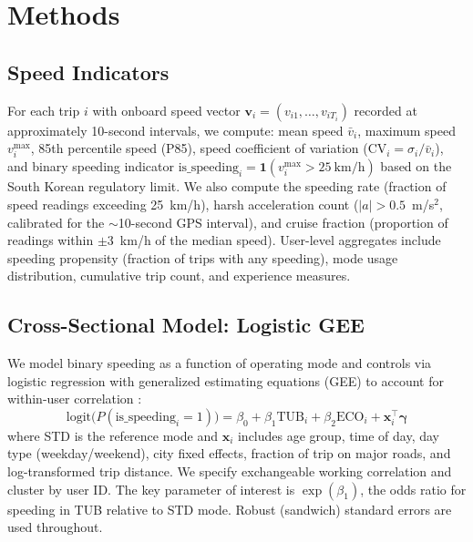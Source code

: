 \section{Methods}
\label{sec:methodology}

\subsection{Speed Indicators}
\label{sec:meth_indicators}

For each trip $i$ with onboard speed vector $\mathbf{v}_i = (v_{i1}, \ldots, v_{iT_i})$ recorded at approximately 10-second intervals, we compute: mean speed $\bar{v}_i$, maximum speed $v_i^{\max}$, 85th percentile speed (P85), speed coefficient of variation ($\text{CV}_i = \sigma_i / \bar{v}_i$), and binary speeding indicator $\text{is\_speeding}_i = \mathbf{1}(v_i^{\max} > 25~\text{km/h})$ based on the South Korean regulatory limit. We also compute the speeding rate (fraction of speed readings exceeding 25~km/h), harsh acceleration count ($|a| > 0.5$~m/s$^2$, calibrated for the $\sim$10-second GPS interval), and cruise fraction (proportion of readings within $\pm$3~km/h of the median speed). User-level aggregates include speeding propensity (fraction of trips with any speeding), mode usage distribution, cumulative trip count, and experience measures.

\subsection{Cross-Sectional Model: Logistic GEE}
\label{sec:meth_gee}

We model binary speeding as a function of operating mode and controls via logistic regression with generalized estimating equations (GEE) to account for within-user correlation \citep{zeger1986longitudinal}:
\begin{equation}
    \text{logit}\big(P(\text{is\_speeding}_i = 1)\big) = \beta_0 + \beta_1 \text{TUB}_i + \beta_2 \text{ECO}_i + \boldsymbol{x}_i^{\top} \boldsymbol{\gamma}
    \label{eq:gee}
\end{equation}
where STD is the reference mode and $\boldsymbol{x}_i$ includes age group, time of day, day type (weekday/weekend), city fixed effects, fraction of trip on major roads, and log-transformed trip distance. We specify exchangeable working correlation and cluster by user ID. The key parameter of interest is $\exp(\beta_1)$, the odds ratio for speeding in TUB relative to STD mode. Robust (sandwich) standard errors are used throughout.

